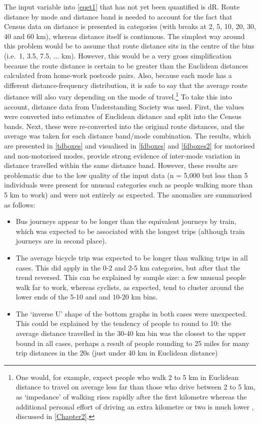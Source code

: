 The input variable into \cref{eqet1} that has not yet been quantified is
dR. Route distance by mode and distance band
is needed to account for the fact that Census data on distance is presented in
categories (with breaks at 2, 5, 10, 20, 30, 40 and 60 km), whereas distance
itself is continuous. The simplest way around this problem would be to
assume that route distance sits in the centre of the bins (i.e.~1, 3.5, 7.5, ...
km). However, this would be a very gross simplification because the route distance
is certain to be greater than the Euclidean distances calculated from
home-work postcode pairs. Also, because each mode has a different
distance-frequency distribution,
it is safe to say that the average route distance will also vary depending
on the mode of travel.\footnote{One would, for example,
expect people who walk 2 to 5
km in Euclidean distance to travel on average less far than those who drive
between 2 to 5 km, as `impedance' of walking rises rapidly after the first
kilometre whereas the additional personal effort of driving
an extra kilometre or two is much lower
\citep{Iacono2010}, discussed in \cref{Chapter2}.
}
To take this into account, distance data from Understanding Society was used.
First, the values were converted into estimates of Euclidean distance and
split into the Census bands. Next, these were re-converted into the original
route distances, and the average was taken for each distance band/mode
combination. The results, which are presented in \cref{tdboxes} and visualised in 
\cref{fdboxes} and \cref{fdboxes2} for motorised and non-motorised modes,
provide strong evidence of inter-mode variation in distance travelled within
the same distance band. However, these results are problematic due to the
low quality of the input data (n = 5,000 but less than 5 individuals
were present for unusual
categories such as people walking more than 5 km to work) and were not entirely
as expected. The anomalies are summarised as follows:
\begin{itemize}
 \item Bus journeys appear to be longer than the equivalent journeys by train,
 which was expected to be associated with the longest trips (although train
 journeys are in second place).
 \item The average bicycle trip was expected to be longer than walking trips
 in all cases. This did apply in the 0-2 and 2-5 km categories, but after that
 the trend reversed. This can be explained by sample size: a few unusual people
 walk far to work, whereas cyclists, as expected, tend to cluster around the lower
 ends of the 5-10 and and 10-20 km bins.
 \item The `inverse U' shape of the bottom graphs in both cases were unexpected.
 This could be explained by the tendency of people to round to 10: the
 average distance travelled in the 30-40 km bin was the closest to the upper
 bound in all cases, perhaps a result of people rounding to 25 miles for many
 trip distances in the 20s (just under 40 km in Euclidean distance)
\end{itemize}
